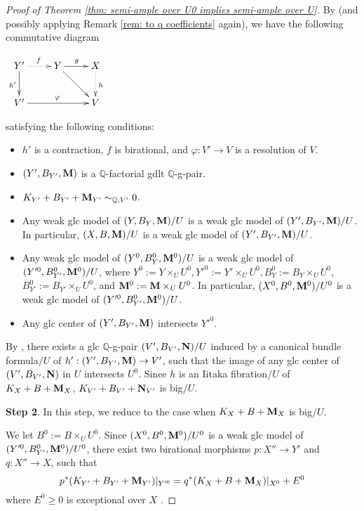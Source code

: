\documentclass[11pt]{amsart}
\numberwithin{equation}{section}
\newcommand{\Mm}{{\bf{M}}}
\newcommand{\NN}{{\bf{N}}}
\theoremstyle{definition}
\theoremstyle{definition}
\theoremstyle{definition}
\begin{document}
\begin{proof}[Proof of Theorem \ref{thm: semi-ample over U0 implies semi-ample over U}]
 By \cite[Theorem 4.2]{LX22} (and possibly applying Remark \ref{rem: to q coefficients} again), we have the following commutative diagram
 \begin{center}$\xymatrix{
Y'\ar@{->}[d]_{h'}\ar@{.>}[r]^{f}& Y\ar@{->}[r]^{g}\ar@{->}[dr] & X\ar@{.>}[d]^{h}\\
V'\ar@{->}[rr]^{\varphi} & & V\\
}$
\end{center}
satisfying the following conditions:
\begin{itemize}
\item $h'$ is a contraction, $f$ is birational, and $\varphi: V'\rightarrow V$ is a resolution of $V$.
\item $(Y',B_{Y'},\Mm)$ is a $\mathbb Q$-factorial gdlt $\mathbb Q$-g-pair.
\item $K_{Y'}+B_{Y'}+\Mm_{Y'}\sim_{\mathbb Q,V'}0$.
\item Any weak glc model of $(Y,B_Y,\Mm)/U$ is a weak glc model of $(Y',B_{Y'},\Mm)/U$. In particular, $(X,B,\Mm)/U$ is a weak glc model of $(Y',B_{Y'},\Mm)/U$.
\item Any weak glc model of $(Y^0,B^0_Y,\Mm^0)/U$ is a weak glc model of $(Y'^0,B^0_{Y'},\Mm^0)/U$, where $Y^0:=Y\times_UU^0,Y'^0:=Y'\times_UU^0,B^0_Y:=B_Y\times_UU^0$, $B^0_{Y'}:=B_{Y'}\times_UU^0$, and $\Mm^0:=\Mm\times_UU^0$. In particular, $(X^0,B^0,\Mm^0)/U^0$ is a weak glc model of $(Y'^0,B^0_{Y'},\Mm^0)/U$.
\item Any glc center of $(Y',B_{Y'},\Mm)$ intersects  $Y'^0$.
\end{itemize}
By \cite[Theorem 2.16]{LX22}, there exists a glc $\mathbb Q$-g-pair $(V',B_{V'},\NN)/U$ induced by a canonical bundle formula$/U$ of $h': (Y',B_{Y'},\Mm)\rightarrow V'$, such that the image of any glc center of $(V',B_{V'},\NN)$ in $U$ intersects $U^0$. Since $h$ is an Iitaka fibration$/U$ of $K_X+B+\Mm_X$, $K_{V'}+B_{V'}+\NN_{V'}$ is big$/U$.



\medskip

\noindent\textbf{Step 2}. In this step, we reduce to the case when $K_X+B+\Mm_X$ is big$/U$.

\smallskip

We let $B^0:=B\times_UU^0$. Since $(X^0,B^0,\Mm^0)/U^0$ is a weak glc model of $(Y'^0,B_{Y'}^0,\Mm^0)/U^0$, there exist two birational morphisms $p: X''\rightarrow Y'$ and $q: X''\rightarrow X$, such that
$$p^*(K_{Y'}+B_{Y'}+\Mm_{Y'})|_{Y'^0}=q^*(K_X+B+\Mm_X)|_{X^0}+E^0$$
where $E^0\geq 0$ is exceptional over $X$ \cite[Lemma 3.8]{HL21a}.


\end{proof}
\end{document}
